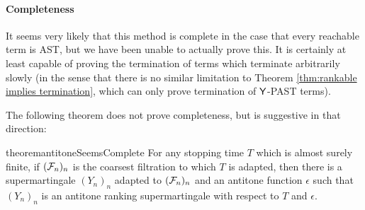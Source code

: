 \paragraph*{Completeness}
It seems very likely that this method is complete in the case that every reachable term is AST, but we have been unable to actually prove this. It is certainly at least capable of proving the termination of terms which terminate arbitrarily slowly (in the sense that there is no similar limitation to Theorem \ref{thm:rankable implies termination}, which can only prove termination of $\mathsf{Y}$-PAST terms).

The following theorem does not prove completeness, but is suggestive in that direction:
\begin{restatable}{theorem}{antitoneSeemsComplete}
For any stopping time $T$ which is almost surely finite, if $(\mathcal{F}_n)_n$ is the coarsest filtration to which $T$ is adapted, then there is a supermartingale $(Y_n)_n$ adapted to $(\mathcal{F}_n)_n$ and an antitone function $\epsilon$ such that $(Y_n)_n$ is an antitone ranking supermartingale with respect to $T$ and $\epsilon$.
\end{restatable}
